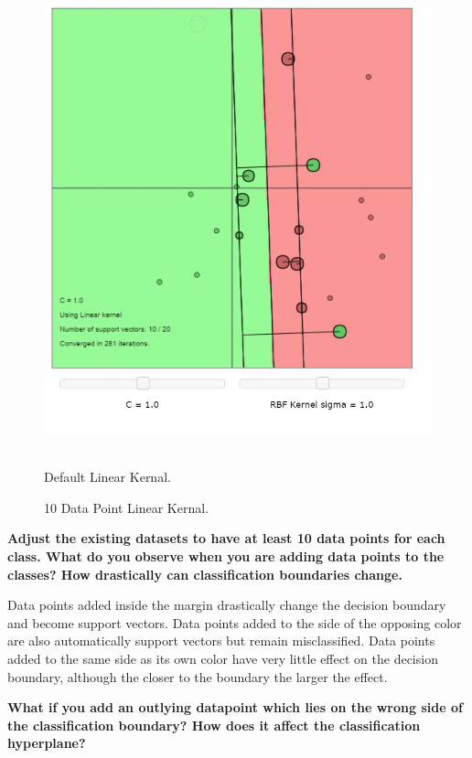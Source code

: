 \documentclass[11pt,oneside,a4paper]{article}
\begin{document}
\begin{figure}[H]
{	}%
	\else
	\hbox{%
		\includegraphics[height=\ht0]{../Figures/10_point_linear_Kernal}%
	}%
	\fi
	\noindent
	\parbox{.45\textwidth}{%
		\centering
		\caption{Default Linear Kernal.}
	}%
	\hfil
	\parbox{.45\textwidth}{%
		\centering
		\caption{10 Data Point Linear Kernal.}
	}%
\end{figure}

\textbf{Adjust the existing datasets to have at least 10 data points for each class. What do you observe when you are adding data points to the classes? How drastically can classification boundaries change.}

Data points added inside the margin drastically change the decision boundary  and become support vectors. Data points added to the side of the opposing color are also automatically support vectors but remain misclassified. Data points added to the same side as its own color have very little effect on the decision boundary, although the closer to the boundary the larger the effect. 

\textbf{What if you add an outlying datapoint which lies on the wrong side of the classification boundary? How does it affect the classification hyperplane?}
\end{document}
